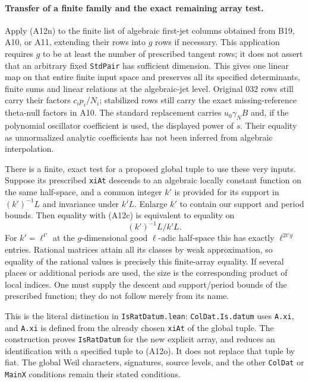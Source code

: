 \paragraph{Transfer of a finite family and the exact remaining array test.}
Apply (A12n) to the finite list of algebraic first-jet
columns obtained from B19, A10, or A11, extending their
rows into $g$ rows if necessary.  This application requires
$g$ to be at least the number of prescribed tangent rows;
it does not assert that an arbitrary fixed \texttt{StdPair}
has sufficient dimension.  This gives one linear
map on that entire finite input space and preserves
all its specified determinants, finite sums and
linear relations at the algebraic-jet level.  Original
032 rows still carry their factors $c_ip_i/N_i$;
stabilized rows still carry the exact missing-reference
theta-null factors in A10.  The standard replacement
carries $u_0\gamma_NB$ and, if the polynomial oscillator
coefficient is used, the displayed power of $s$.
Their equality as unnormalized analytic coefficients
has not been inferred from algebraic interpolation.

There is a finite, exact test for a proposed global
tuple to use these very inputs.  Suppose its prescribed
\texttt{xiAt} descends to an algebraic locally constant
function on the same half-space, and a common integer
$k'$ is provided for its support in $(k')^{-1}L$
and invariance under $k'L$.  Enlarge $k'$ to contain
our support and period bounds.  Then equality with
(A12c) is equivalent to equality on
\[
                        (k')^{-1}L/k'L.
 \tag{A12o}
\]
For $k'=\ell^{t'}$ at the $g$-dimensional good
$\ell$-adic half-space this has exactly
$\ell^{2t'g}$ entries.  Rational matrices attain all
its classes by weak approximation, so equality of
the rational values is precisely this finite-array
equality.  If several places or additional periods
are used, the size is the corresponding product of
local indices.  One must supply the descent and
support/period bounds of the prescribed function;
they do not follow merely from its name.

This is the literal distinction in
\texttt{IsRatDatum.lean}: \texttt{ColDat.Is.datum}
uses \texttt{A.xi}, and \texttt{A.xi} is defined
from the already chosen \texttt{xiAt} of the global
tuple.  The construction proves \texttt{IsRatDatum}
for the new explicit array, and reduces an identification
with a specified tuple to (A12o).  It does not replace
that tuple by fiat.  The global Weil characters,
signatures, source levels, and the other \texttt{ColDat}
or \texttt{MainX} conditions remain their stated
conditions.

